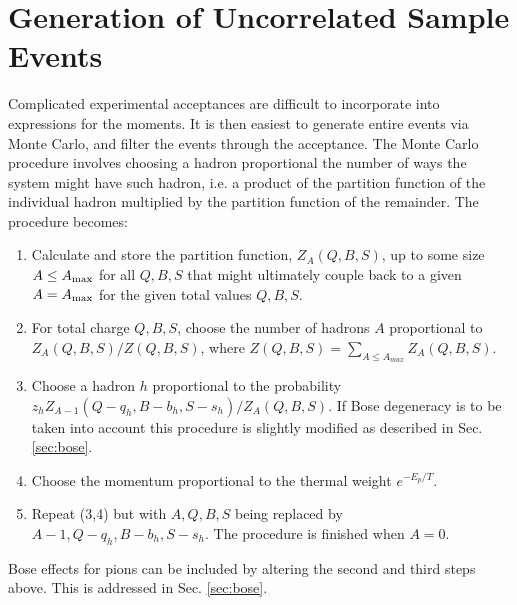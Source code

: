 

\section{Generation of Uncorrelated Sample Events}\label{sec:theoryMC}

Complicated experimental acceptances are difficult to incorporate into expressions for the moments. It is then easiest to generate entire events via Monte Carlo, and filter the events through the acceptance. The Monte Carlo procedure involves choosing a hadron proportional the number of ways the system might have such hadron, i.e. a product of the partition function of the individual hadron multiplied by the partition function of the remainder. The procedure becomes:
\begin{enumerate}
\item Calculate and store the partition function, $Z_A(Q,B,S)$, up to some size $A\le A_{\rm max}$ for all $Q,B,S$ that might ultimately couple back to a given $A=A_{\rm max}$ for the given total values $Q,B,S$. 
\item For total charge $Q,B,S$, choose the number of hadrons $A$ proportional to $Z_A(Q,B,S)/Z(Q,B,S)$, where $Z(Q,B,S) = \sum_{A\le A_{max}}Z_A(Q,B,S)$.
\item Choose a hadron $h$ proportional to the probability $z_hZ_{A-1}(Q-q_h,B-b_h,S-s_h)/Z_A(Q,B,S)$. If Bose degeneracy is to be taken into account this procedure is slightly modified as described in Sec. \ref{sec:bose}.
\item Choose the momentum proportional to the thermal weight $e^{-E_p/T}$.
\item Repeat (3,4) but with $A,Q,B,S$ being replaced by $A-1,Q-q_h,B-b_h,S-s_h$. The procedure is finished when $A=0$.
\end{enumerate}
Bose effects for pions can be included by altering the second and third steps above. This is addressed in Sec. \ref{sec:bose}.

